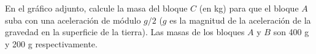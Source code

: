 \noindent En el gráfico adjunto, calcule la masa del bloque $C$ (en kg) para que el bloque $A$ suba con una aceleración de módulo $g/2$ ($g$ es la magnitud de la aceleración de la gravedad en la superficie de la tierra). Las masas de los bloques $A$ y $B$ son 400 g y 200 g respectivamente.
\begin{center}
\end{center}
